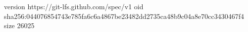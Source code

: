 version https://git-lfs.github.com/spec/v1
oid sha256:044076854743e785fa6c6a4867be23482dd2735ca48b9c04a8e70cc3430467f4
size 26025
